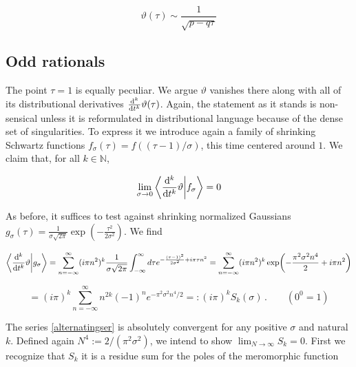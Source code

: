 \documentclass{article}
\newcommand{\cmnt}[1]{\textcolor{red}{\emph{#1}}}
\newcommand{\intR}{\int_{-\infty}^\infty}
\newcommand{\sumZ}{\sum_{n=-\infty}^{\infty}}
\begin{document}
\begin{equation}
    \vartheta(\tau) \sim \frac{1}{\sqrt{p-q\tau}}
\end{equation}



\subsection{Odd rationals}

The point $\tau=1$ is equally peculiar. We argue $\vartheta$ vanishes there along with all of its distributional derivatives $\dv[k]{t} \vartheta(\tau)$. Again, the statement as it stands is non-sensical unless it is reformulated in distributional language because of the dense set of singularities. To express it we introduce again a family of shrinking Schwartz functions $f_\sigma(\tau) = f((\tau-1)/\sigma)$, this time centered around $1$. We claim that, for all $k \in \mathbb{N}$,

\begin{equation}
    \lim_{\sigma \rightarrow 0} \bra{ \dv[k]{t}\vartheta}\ket{ f_\sigma } = 0
\end{equation}

As before, it suffices to test against shrinking normalized Gaussians $g_\sigma(\tau) = \frac{1}{\sigma\sqrt{2\pi}} \exp( - \frac{\tau^2}{2\sigma^2} )$. We find

\begin{equation}
    \bra{\dv[k]{t}\vartheta}\ket{g_\sigma} = \sumZ (i\pi n^2)^k \frac{1}{\sigma\sqrt{2\pi}} \intR d\tau e^{- \frac{(\tau-1)^2}{2\sigma^2} + i\pi\tau n^2} = \sumZ (i\pi n^2)^k \exp( - \frac{\pi^2 \sigma^2 n^4}{2} + i\pi n^2)
\end{equation}

\begin{equation}\label{alternatingser}
    = (i\pi)^k \sumZ n^{2k} (-1)^n e^{-\pi^2 \sigma^2 n^4/2} =: (i\pi)^k S_k(\sigma)\,.\quad\quad(0^0 = 1)
\end{equation}

The series \eqref{alternatingser} is absolutely convergent for any positive $\sigma$ and natural $k$. Defined again $N^4 := 2/(\pi^2 \sigma^2)$, we intend to show  $\lim_{N \rightarrow \infty} S_k = 0$. First we recognize that $S_k$ it is a residue sum for the poles of the meromorphic function
\end{document}
